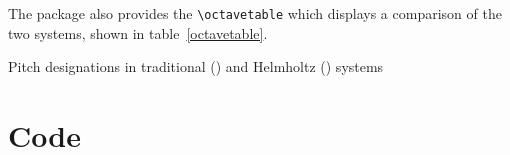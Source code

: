\documentclass{article}
\begin{document}
The package also provides the \verb|\octavetable| which displays a comparison
of the two systems, shown in table~\ref{octavetable}.

\begin{table}
    \caption{Pitch designations in traditional () and Helmholtz
    () systems}
    \label{octavetable}
    \begin{center}
    \octavetable
    \end{center}
\end{table}

\section{Code}

\end{document}
